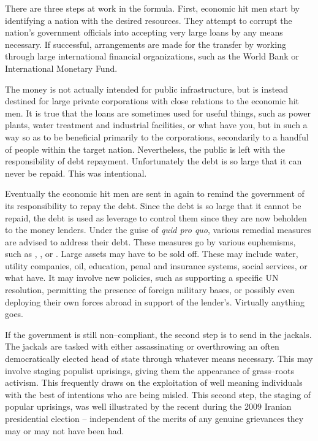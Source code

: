 There are three steps at work in the formula. First, economic hit men start by identifying a nation with the desired resources. They attempt to corrupt the nation's government officials into accepting very large loans by any means necessary. If successful, arrangements are made for the transfer by working through large international financial organizations, such as the World Bank or International Monetary Fund.

The money is not actually intended for public infrastructure, but is instead destined for large private corporations with close relations to the economic hit men. It is true that the loans are sometimes used for useful things, such as power plants, water treatment and industrial facilities, or what have you, but in such a way so as to be beneficial primarily to the corporations, secondarily to a handful of people within the target nation. Nevertheless, the public is left with the responsibility of debt repayment. Unfortunately the debt is so large that it can never be repaid. This was intentional.

Eventually the economic hit men are sent in again to remind the government of its responsibility to repay the debt. Since the debt is so large that it cannot be repaid, the debt is used as leverage to control them since they are now beholden to the money lenders. Under the guise of {\it quid pro quo}, various remedial measures are advised to address their debt. These measures go by various euphemisms, such as , , or . Large assets may have to be sold off. These may include water, utility companies, oil, education, penal and insurance systems, social services, or what have. It may involve new policies, such as supporting a specific UN resolution, permitting the presence of foreign military bases, or possibly even deploying their own forces abroad in support of the lender's. Virtually anything goes.

If the government is still non--compliant, the second step is to send in the jackals. The jackals are tasked with either assassinating or overthrowing an often democratically elected head of state through whatever means necessary. This may involve staging populist uprisings, giving them the appearance of grass--roots activism. This frequently draws on the exploitation of well meaning individuals with the best of intentions who are being misled. This second step, the staging of popular uprisings, was well illustrated by the recent  during the 2009 Iranian presidential election -- independent of the merits of any genuine grievances they may or may not have been had.\footnotecite[hersh2008]\footnotecite[ross2007]

